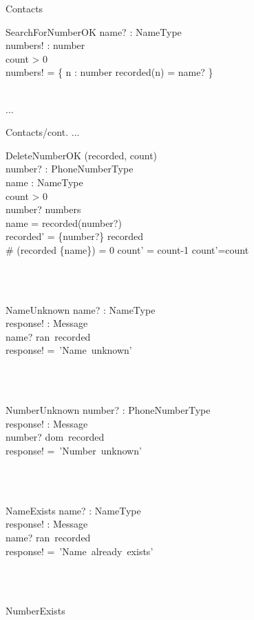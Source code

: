 \documentclass[12pt]{article}
\begin{document}
\begin{spacing}{1.5}
\begin{class}{Contacts}
\begin{op}{SearchForNumberOK}
name? : NameType\\
numbers! : \pset number\\
\ST
count > 0 \\
numbers! = \{ n : number \cbar recorded(n) = name? \}
\end{op}\\
...
\end{class}
\newpage
\begin{class}{Contacts/cont.}
...
\also
\begin{op}{DeleteNumberOK}
\Delta (recorded, count) \\
number? : PhoneNumberType\\
name : NameType\\
\ST
count > 0 \\
number? \in numbers\\
name = recorded(number?)\\
recorded' = \{number?\} \ndres recorded \\
 \# (recorded \rres \{name\}) = 0  count' = count-1  count'=count\\
\end{op}\\
\\
\begin{op}{NameUnknown}
name? : NameType\\
response! : Message\\
\ST
name? \notin ran~recorded\\
response! =~'Name~unknown'
\end{op}\\
\\
\begin{op}{NumberUnknown}
number? : PhoneNumberType\\
response! : Message\\
\ST
number? \notin dom~recorded\\
response! =~'Number~unknown'
\end{op}\\
\\
\begin{op}{NameExists}
name? : NameType\\
response! : Message\\
\ST
name? \in ran~recorded\\
response! =~'Name~already~exists'
\end{op}\\
\\
\begin{op}{NumberExists}

\end{op}
\end{class}
\end{spacing}
\end{document}
